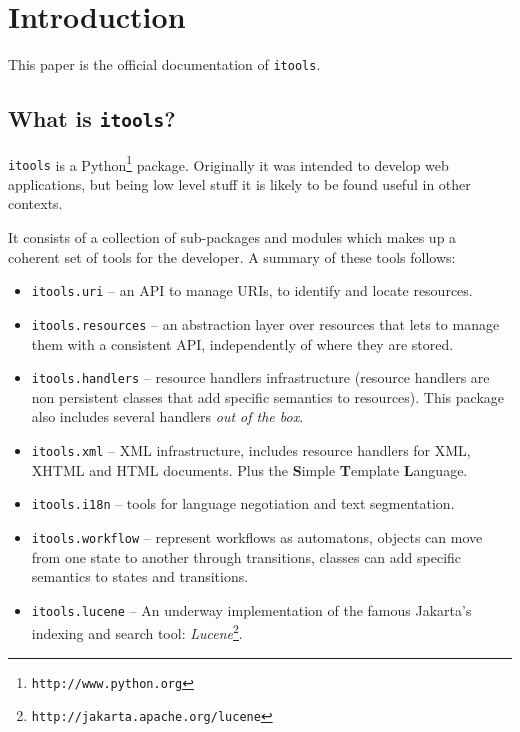 \chapter{Introduction}

This paper is the official documentation of {\tt itools}.

\section{What is {\tt itools}?}

{\tt itools} is a Python\footnote{\tt http://www.python.org} package.
Originally it was intended to develop web applications, but being low
level stuff it is likely to be found useful in other contexts.

It consists of a collection of sub-packages and modules which makes up a
coherent set of tools for the developer. A summary of these tools follows:

\begin{itemize}
 \item {\tt itools.uri} -- an API to manage URIs, to identify and locate
    resources.

 \item {\tt itools.resources} -- an abstraction layer over resources that
   lets to manage them with a consistent API, independently of where they
   are stored.

 \item {\tt itools.handlers} -- resource handlers infrastructure (resource
   handlers are non persistent classes that add specific semantics to
   resources). This package also includes several handlers {\em out of the
   box}.

 \item {\tt itools.xml} -- XML infrastructure, includes resource handlers
   for XML, XHTML and HTML documents. Plus the {\bf S}imple {\bf T}emplate
   {\bf L}anguage.

 \item {\tt itools.i18n} -- tools for language negotiation and text
   segmentation.

 \item {\tt itools.workflow} -- represent workflows as automatons, objects
   can move from one state to another through transitions, classes can add
   specific semantics to states and transitions.

 \item {\tt itools.lucene} -- An underway implementation of the famous
   Jakarta's indexing and search tool:
   {\em Lucene}\footnote{\tt http://jakarta.apache.org/lucene}.
\end{itemize}



